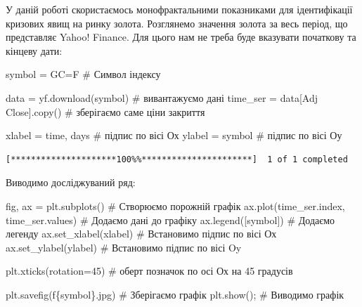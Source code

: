 \documentclass[
  letterpaper,
]{report}
\newenvironment{Shaded}{\begin{snugshade}}{\end{snugshade}}
\newcommand{\CommentTok}[1]{\textcolor[rgb]{0.37,0.37,0.37}{#1}}
\newcommand{\DecValTok}[1]{\textcolor[rgb]{0.68,0.00,0.00}{#1}}
\newcommand{\NormalTok}[1]{\textcolor[rgb]{0.00,0.23,0.31}{#1}}
\newcommand{\OperatorTok}[1]{\textcolor[rgb]{0.37,0.37,0.37}{#1}}
\newcommand{\SpecialCharTok}[1]{\textcolor[rgb]{0.37,0.37,0.37}{#1}}
\newcommand{\SpecialStringTok}[1]{\textcolor[rgb]{0.13,0.47,0.30}{#1}}
\newcommand{\StringTok}[1]{\textcolor[rgb]{0.13,0.47,0.30}{#1}}
\begin{document}
У даній роботі скористаємось монофрактальними показниками для
ідентифікації кризових явищ на ринку золота. Розглянемо значення золота
за весь період, що представляє Yahoo! Finance. Для цього нам не треба
буде вказувати початкову та кінцеву дати:

\begin{Shaded}
\begin{Highlighting}[]
\NormalTok{symbol }\OperatorTok{=} \StringTok{\textquotesingle{}GC=F\textquotesingle{}}                       \CommentTok{\# Символ індексу}

\NormalTok{data }\OperatorTok{=}\NormalTok{ yf.download(symbol)            }\CommentTok{\# вивантажуємо дані}
\NormalTok{time\_ser }\OperatorTok{=}\NormalTok{ data[}\StringTok{\textquotesingle{}Adj Close\textquotesingle{}}\NormalTok{].copy()   }\CommentTok{\# зберігаємо саме ціни закриття}

\NormalTok{xlabel }\OperatorTok{=} \StringTok{\textquotesingle{}time, days\textquotesingle{}}                 \CommentTok{\# підпис по вісі Ох }
\NormalTok{ylabel }\OperatorTok{=}\NormalTok{ symbol                       }\CommentTok{\# підпис по вісі Оу}
\end{Highlighting}
\end{Shaded}

\begin{verbatim}
[*********************100%%**********************]  1 of 1 completed
\end{verbatim}

Виводимо досліджуваний ряд:

\begin{Shaded}
\begin{Highlighting}[]
\NormalTok{fig, ax }\OperatorTok{=}\NormalTok{ plt.subplots()                   }\CommentTok{\# Створюємо порожній графік}
\NormalTok{ax.plot(time\_ser.index, time\_ser.values)   }\CommentTok{\# Додаємо дані до графіку}
\NormalTok{ax.legend([symbol])                        }\CommentTok{\# Додаємо легенду}
\NormalTok{ax.set\_xlabel(xlabel)                      }\CommentTok{\# Встановимо підпис по вісі Ох}
\NormalTok{ax.set\_ylabel(ylabel)                      }\CommentTok{\# Встановимо підпис по вісі Oy}

\NormalTok{plt.xticks(rotation}\OperatorTok{=}\DecValTok{45}\NormalTok{)                    }\CommentTok{\# оберт позначок по осі Ох на 45 градусів}

\NormalTok{plt.savefig(}\SpecialStringTok{f\textquotesingle{}}\SpecialCharTok{\{}\NormalTok{symbol}\SpecialCharTok{\}}\SpecialStringTok{.jpg\textquotesingle{}}\NormalTok{)               }\CommentTok{\# Зберігаємо графік }
\NormalTok{plt.show()}\OperatorTok{;}                                \CommentTok{\# Виводимо графік}
\end{Highlighting}
\end{Shaded}
\end{document}
